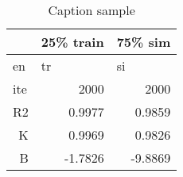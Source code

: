 \begin{table}[htbp]
\caption{Caption sample}
\begin{center}
\begin{tabular}{|l|r|r|}
\hline
 & \multicolumn{1}{l|}{25\% train} & \multicolumn{1}{l|}{75\% sim} \\ \hline
en & \multicolumn{1}{l|}{tr} & \multicolumn{1}{l|}{si} \\ \hline
ite & 2000 & 2000 \\ \hline
\multicolumn{1}{|r|}{R2} & 0.9977 & 0.9859 \\ \hline
\multicolumn{1}{|r|}{K} & 0.9969 & 0.9826 \\ \hline
\multicolumn{1}{|r|}{B} & -1.7826 & -9.8869 \\ \hline
\end{tabular}
\end{center}
\label{Tab_sample}
\end{table}

